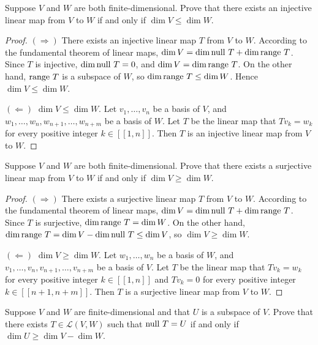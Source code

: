 \begin{exercise}
    Suppose $V$ and $W$ are both finite-dimensional. Prove that there exists an injective linear map from $V$ to $W$ if and only if $\dim V \leq \dim W$.
\end{exercise}

\begin{proof}
    $(\Rightarrow)$ There exists an injective linear map $T$ from $V$ to $W$. According to the fundamental theorem of linear maps, $\dim V = \dim\operatorname{null}\,{T} + \dim\operatorname{range}\,{T}$. Since $T$ is injective, $\dim\operatorname{null}\,{T} = 0$, and $\dim V = \dim\operatorname{range}\,{T}$. On the other hand, $\operatorname{range}\,{T}$ is a subspace of $W$, so $\dim\operatorname{range}\,{T}\leq \dim W$. Hence $\dim V\leq \dim W$.

    $(\Leftarrow)$ $\dim V\leq \dim W$. Let $v_{1}, \ldots, v_{n}$ be a basis of $V$, and $w_{1}, \ldots, w_{n}, w_{n+1}, \ldots, w_{n+m}$ be a basis of $W$. Let $T$ be the linear map that $Tv_{k} = w_{k}$ for every positive integer $k\in [\![ 1,n ]\!]$. Then $T$ is an injective linear map from $V$ to $W$.
\end{proof}
\newpage

\begin{exercise}
    Suppose $V$ and $W$ are both finite-dimensional. Prove that there exists a surjective linear map from $V$ to $W$ if and only if $\dim V \geq \dim W$.
\end{exercise}

\begin{proof}
    $(\Rightarrow)$ There exists a surjective linear map $T$ from $V$ to $W$. According to the fundamental theorem of linear maps, $\dim V = \dim\operatorname{null}\,{T} + \dim\operatorname{range}\,{T}$. Since $T$ is surjective, $\dim\operatorname{range}\,{T} = \dim W$. On the other hand, $\dim\operatorname{range}\,{T} = \dim V - \dim\operatorname{null}\,{T}\leq \dim V$, so $\dim V\geq \dim W$.

    $(\Leftarrow)$ $\dim V\geq \dim W$. Let $w_{1}, \ldots, w_{n}$ be a basis of $W$, and $v_{1}, \ldots, v_{n}, v_{n+1}, \ldots, v_{n+m}$ be a basis of $V$. Let $T$ be the linear map that $Tv_{k} = w_{k}$ for every positive integer $k\in [\![ 1,n ]\!]$ and $Tv_{k} = 0$ for every positive integer $k\in [\![ n+1, n+m ]\!]$. Then $T$ is a surjective linear map from $V$ to $W$.
\end{proof}
\newpage

\begin{exercise}
    Suppose $V$ and $W$ are finite-dimensional and that $U$ is a subspace of $V$. Prove that there exists $T\in \mathcal{L}(V, W)$ such that $\operatorname{null}\,{T} = U$ if and only if $\dim U \geq \dim V - \dim W$.
\end{exercise}

